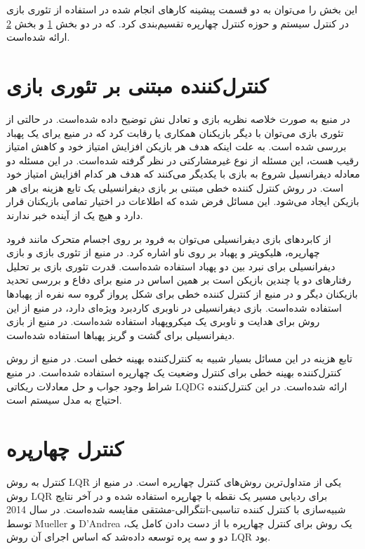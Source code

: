 
این بخش را می‌توان به دو قسمت پیشینه کارهای انجام شده در استفاده از تئوری بازی در کنترل سیستم و حوزه کنترل چهارپره 
تقسیم‌بندی کرد. که در دو بخش \ref{gameControl} و بخش \ref{QuadControl} ارائه شده‌است.
\section{کنترل‌کننده مبتنی بر تئوری بازی}\label{gameControl}
در منبع \cite{article1} به صورت خلاصه نظریه بازی و تعادل نش توضیح داده شده‌است. در حالتی از تئوری بازی می‌توان با دیگر بازیکنان همکاری یا رقابت کرد که در منیع\cite{8376282} یرای یک پهباد بررسی شده است. به علت اینکه هدف هر بازیکن افزایش امتیاز خود و کاهش امتیاز رقیب هست، این مسئله از نوع غیرمشارکتی در نظر گرفته شده‌است. در این مسئله دو معادله دیفرانسیل شروع به بازی با یکدیگر می‌کنند که هدف هر کدام افزایش امتیاز خود است. در روش کنترل کننده خطی مبتنی بر بازی دیفرانسیلی یک تابع هزینه برای هر بازیکن ایجاد می‌شود. این مسائل فرض شده که اطلاعات در اختیار تمامی بازیکنان قرار دارد و هیچ یک از آینده خبر ندارند.

از کابردهای بازی دیفرانسیلی می‌توان به فرود بر روی اجسام متحرک مانند فرود چهارپره، هلیکوپتر و پهباد بر روی ناو\cite{8996044} اشاره کرد. در منبع \cite{9001045} از تئوری بازی و بازی دیفرانسیلی برای نبرد بین دو پهباد استفاده شده‌است. قدرت تئوری بازی بر تحلیل رفتارهای دو یا چندین بازیکن است بر همین اساس در منبع \cite{Pachter2019} برای دفاع و بررسی تحدید بازیکنان دیگر و در منبع \cite{7502594} از کنترل کننده خطی برای شکل پرواز گروه سه نفره از پهبادها استفاده شده‌است. بازی دیفرانسیلی در ناوبری کاردبرد ویژه‌ای دارد، در منبع \cite{6160198} از این روش برای هدایت و ناوبری یک میکروپهباد استفاده شده‌است. در منبع \cite{1595165} از بازی دیفرانسیلی برای گشت و گریز پهباها استفاده شده‌است.

تابع هزینه در این مسائل بسیار شبیه به کنترل‌کننده بهینه خطی است. در منبع \cite{4399042} از روش کنترل‌کننده بهینه خطی برای کنترل وضعیت یک چهارپره استفاده شده‌است. در منبع \cite{article2} شراط وجود جواب و حل معادلات ریکاتی  LQDG ارائه شده‌است. در این کنترل‌کننده احتیاج به مدل سیستم است.
\section{کنترل چهارپره}\label{QuadControl}
کنترل به روش LQR یکی از متداول‌ترین روش‌های کنترل چهارپره است.
در منبع \cite{8394911} از روش LQR برای ردیابی مسیر یک نقطه   با چهارپره استفاده شده و در آخر نتایج شبیه‌سازی با کنترل کننده تناسبی-انتگرالی-مشتقی مقایسه شد‌ه‌است. 
در سال 2014 توسط Mueller و D’Andrea یک روش برای کنترل چهارپره با از دست دادن کامل یک، دو و سه پره توسعه داده‌شد که اساس اجرای آن روش LQR بود\cite{6906588}.

